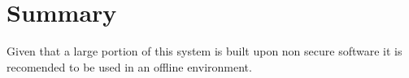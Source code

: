 \section{Summary}\label{Summary}

Given that a large portion of this system is built upon non secure software it is recomended to be used in an offline environment.